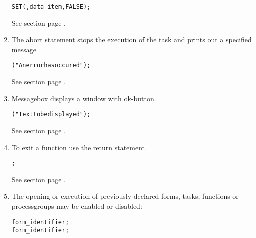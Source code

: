 \begin{enumerate}
\begin{boxedminipage}[t]{\linewidth}
\begin{alltt}
  SET( \LOCK, data_item, FALSE );
\end{alltt}
\end{boxedminipage}

See section  page \pageref{fudatastatements}. \\
\item The abort statement stops the execution of the task and 
prints out a specified message

\begin{boxedminipage}[t]{\linewidth}
\begin{alltt}
  \ABORT ("An error has occured");
\end{alltt}
\end{boxedminipage}

See section  page \pageref{fuprintstatements}. \\
\item Messagebox displays a window with ok-button.

\begin{boxedminipage}[t]{\linewidth}
\begin{alltt}
  \MESSAGEBOX ("Text to be displayed");
\end{alltt}
\end{boxedminipage}

See section  page \pageref{fumessagebox}. \\
\item To exit a function use the return statement

\begin{boxedminipage}[t]{\linewidth}
\begin{alltt}
  \RETURN;
\end{alltt}
\end{boxedminipage}

See section  page \pageref{fumessagebox}. \\
\item The opening or execution of previously declared 
forms, tasks, functions or processgroups
may be enabled or disabled:

\begin{boxedminipage}[t]{\linewidth}
\begin{alltt}
  \ALLOW{} form_identifier;
  \DISALLOW{} form_identifier;
\end{alltt}
\end{boxedminipage}


\end{enumerate}
